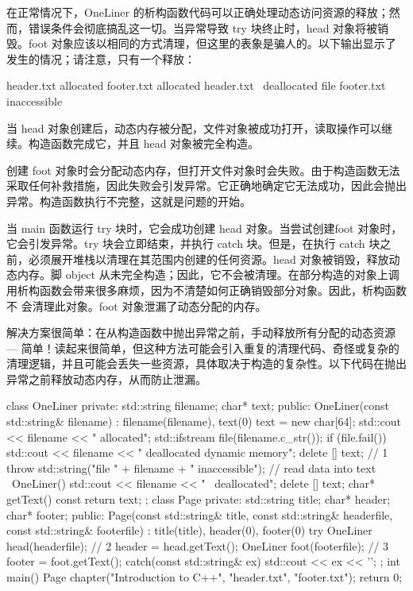 在正常情况下，OneLiner 的析构函数代码可以正确处理动态访问资源的释放；然而，错误条件会彻底搞乱这一切。当异常导致 try 块终止时，head 对象将被销毁。foot 对象应该以相同的方式清理，但这里的表象是骗人的。以下输出显示了发生的情况；请注意，只有一个释放：

\begin{shell}
header.txt allocated
footer.txt allocated
header.txt ~deallocated
file footer.txt inaccessible
\end{shell}


当 head 对象创建后，动态内存被分配，文件对象被成功打开，读取操作可以继续。构造函数完成它，并且 head 对象被完全构造。

创建 foot 对象时会分配动态内存，但打开文件对象时会失败。由于构造函数无法采取任何补救措施，因此失败会引发异常。它正确地确定它无法成功，因此会抛出异常。构造函数执行不完整，这就是问题的开始。

当 main 函数运行 try 块时，它会成功创建 head 对象。当尝试创建foot 对象时，它会引发异常。try 块会立即结束，并执行 catch 块。但是，在执行 catch 块之前，必须展开堆栈以清理在其范围内创建的任何资源。head 对象被销毁，释放动态内存。脚 object 从未完全构造；因此，它不会被清理。在部分构造的对象上调用析构函数会带来很多麻烦，因为不清楚如何正确销毁部分对象。因此，析构函数不 会清理此对象。foot 对象泄漏了动态分配的内存。


解决方案很简单：在从构造函数中抛出异常之前，手动释放所有分配的动态资源 — 简单！读起来很简单，但这种方法可能会引入重复的清理代码、奇怪或复杂的清理逻辑，并且可能会丢失一些资源，具体取决于构造的复杂性。以下代码在抛出异常之前释放动态内存，从而防止泄漏。


\begin{cpp}
class OneLiner {
private:
  std::string filename;
  char* text;
public:
  OneLiner(const std::string& filename) : filename(filename), text(0) {
    text = new char[64];
    std::cout << filename << " allocated\n";
    std::ifstream file(filename.c_str());
    if (file.fail()) {
      std::cout << filename << " deallocated dynamic memory\n";
      delete [] text; // 1
      throw std::string("file " + filename + " inaccessible");
    }
    // read data into text
  }
  ~OneLiner() {
    std::cout << filename << " ~deallocated\n";
    delete [] text;
  }
  char* getText() const { return text; }
};
class Page {
private:
  std::string title;
  char* header;
  char* footer;
public:
  Page(const std::string& title, const std::string& headerfile, const
  std::string& footerfile) :
      title(title), header(0), footer(0) {
    try {
      OneLiner head(headerfile); // 2
      header = head.getText();
      OneLiner foot(footerfile); // 3
      footer = foot.getText();
    } catch(const std::string& ex) {
      std::cout << ex << '\n';
    }
  }
};
int main() {
  Page chapter("Introduction to C++", "header.txt", "footer.txt");
  return 0;
}
\end{cpp}

